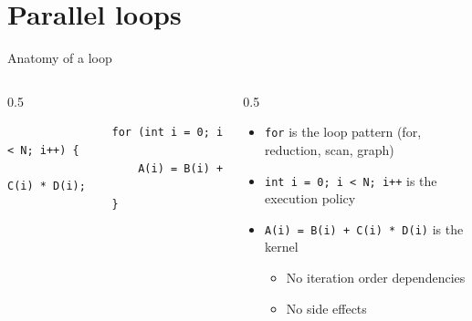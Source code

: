 \documentclass[
    aspectratio=169,
    \createHandout
]{beamer}
\begin{document}
\section{Parallel loops}


\begin{frame}[fragile]{Anatomy of a loop}
    \begin{columns}
        \begin{column}{0.5\linewidth}
            \begin{verbatim}
                for (int i = 0; i < N; i++) {
                    A(i) = B(i) + C(i) * D(i);
                }
            \end{verbatim}
        \end{column}
        \begin{column}{0.5\linewidth}
            \begin{itemize}
                \item \texttt{for} is the loop pattern (for, reduction, scan, graph)
                \item \texttt{int i = 0; i < N; i++} is the execution policy
                \item \texttt{A(i) = B(i) + C(i) * D(i)} is the kernel
                \begin{itemize}
                    \item No iteration order dependencies
                    \item No side effects
                \end{itemize}
            \end{itemize}
        \end{column}
    \end{columns}
\end{frame}

\end{document}
